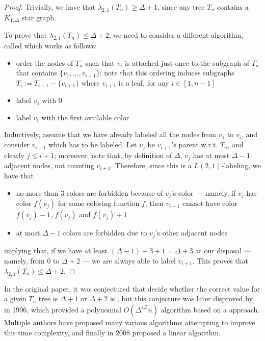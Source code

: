 \documentclass[a4paper, 12pt]{report}
\begin{document}
    \begin{proof}
        Trivially, we have that $\lambda_{2,1}(T_n) \ge \Delta + 1$, since any tree $T_n$ contains a $K_{1, \Delta}$ star graph.

        To prove that $\lambda_{2,1}(T_n) \le \Delta + 2$, we need to consider a different  algorithm, called  which works as follows:

        \begin{itemize}
            \item order the nodes of $T_n$ such that $v_i$ is attached just once to the subgraph of $T_n$ that contains $\{v_1, \ldots , v_{i -1 }\}$; note that this ordering induces subgraphs $T_i := T_{i + 1} - \{v_{ i +1}\}$ where $v_{i + 1}$ is a leaf, for any $i \in [1, n - 1]$
            \item label $v_1$ with 0
            \item label $v_i$ with the first available color
        \end{itemize}

        Inductively, assume that we have already labeled all the nodes from $v_1$ to $v_i$, and consider $v_{i + 1}$ which has to be labeled. Let $v_j$ be $v_{i + 1}$'s parent w.r.t. $T_n$, and clearly $j \le i + 1$; moreover, note that, by definition of $\Delta$, $v_j$ has at most $\Delta - 1$ adjacent nodes, not counting $v_{i + 1}$. Therefore, since this is a $L(2,1)$-labeling, we have that

        \begin{itemize}
            \item no more than 3 colors are forbidden because of $v_j$'s color --- namely, if $v_j$ has color $f(v_j)$ for some coloring function $f$, then $v_{i + 1}$ cannot have color $f(v_j) - 1$, $f(v_j)$ and $f(v_j) + 1$
            \item at most $\Delta - 1$ colors are forbidden due to $v_j$'s other adjacent nodes
        \end{itemize}
        
        implying that, if we have at least $(\Delta - 1) + 3 + 1 = \Delta + 3$ at our disposal --- namely, from 0 to $\Delta + 2$ --- we are always able to label $v_{i+1}$. This proves that $\lambda_{2,1}(T_n) \le \Delta + 2$.
    \end{proof}

    In the original paper, it was conjectured that decide whether the correct value for a given $T_n$ tree is $\Delta + 1$ or $\Delta + 2$ is \NPComplete, but this conjecture was later disproved by \textcite{chang} in 1996, which provided a polynomial $O(\Delta^{4.5} n)$ algorithm based on a  approach. Multiple authors have proposed many various algorithms attempting to improve this time complexity, and finally in 2008 \textcite{hasunuma} proposed a linear algorithm.
\end{document}
